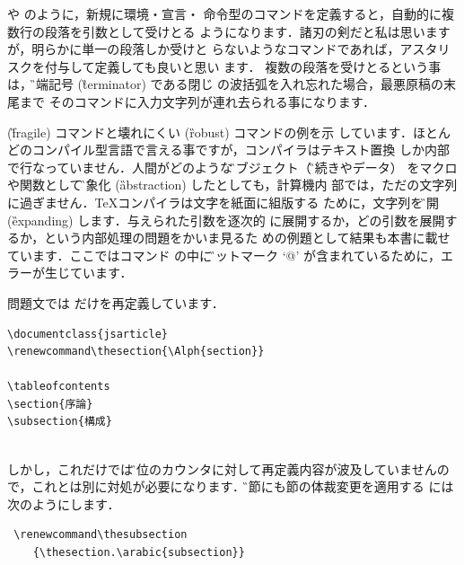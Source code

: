 \begin{description}
 や  のように，新規に環境・宣言・
命令型のコマンドを定義すると，自動的に複数行の段落を引数として受けとる
ようになります．諸刃の剣だと私は思いますが，明らかに単一の段落しか受けと
らないようなコマンドであれば，アスタリスクを付与して定義しても良いと思い
ます．
複数の段落を受けとるという事は，\G{終端記号} (\G{terminator}) である閉じ
の波括弧を入れ忘れた場合，最悪原稿の末尾まで
そのコマンドに入力文字列が連れ去られる事になります．

 (\G{fragile}) コマンドと壊れにくい (\G{robust}) コマンドの例を示
しています．ほとんどのコンパイル型言語で言える事ですが，コンパイラはテキスト置換
しか内部で行なっていません．人間がどのような\G{オブジェクト}（\G{手続きやデータ}）
をマクロや関数として\G{抽象化} (\G{abstraction}) したとしても，計算機内
 部では，ただの文字列に過ぎません．\TeX コンパイラは文字を紙面に組版する
 ために，文字列を\G{展開} (\G{expanding}) します．与えられた引数を逐次的
 に展開するか，どの引数を展開するか，という内部処理の問題をかいま見るた
 めの例題として結果も本書に載せています．ここではコマンド
 の中に\G{アットマーク} `@' が含まれているために，エラーが生じています．

問題文では  だけを再定義しています．
\begin{verbatim}
\documentclass{jsarticle} 
\renewcommand\thesection{\Alph{section}} 
 
\tableofcontents 
\section{序論} 
\subsection{構成} 
 
\end{verbatim}
しかし，これだけでは\G{下位のカウンタ}に対して再定義内容が波及していませんの
で，これとは別に対処が必要になります．\G{小節}にも節の体裁変更を適用する
には次のようにします．
\begin{verbatim}
 \renewcommand\thesubsection
    {\thesection.\arabic{subsection}}
\end{verbatim}

\end{description}

